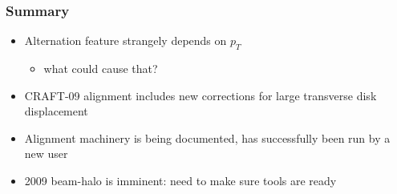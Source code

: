 \documentclass[compress]{beamer}
\begin{document}


\begin{frame}
\frametitle{Summary}
\begin{itemize}\setlength{\itemsep}{0.75 cm}
\item Alternation feature strangely depends on $p_T$
\begin{itemize}
\item what could cause that?
\end{itemize}

\item CRAFT-09 alignment includes new corrections for large transverse disk displacement
\item Alignment machinery is being documented, has successfully been run by a new user
\item 2009 beam-halo is imminent: need to make sure tools are ready
\end{itemize}
\label{numpages}
\end{frame}
\end{document}
